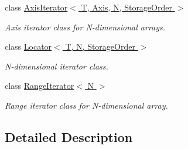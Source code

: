 \begin{DoxyCompactItemize}
class \hyperlink{class_d_o_1_1_axis_iterator}{Axis\-Iterator$<$ T, Axis, N, Storage\-Order $>$}
\begin{DoxyCompactList}\small\item\em Axis iterator class for N-\/dimensional arrays. \end{DoxyCompactList}\item 
class \hyperlink{class_d_o_1_1_locator}{Locator$<$ T, N, Storage\-Order $>$}
\begin{DoxyCompactList}\small\item\em N-\/dimensional iterator class. \end{DoxyCompactList}\item 
class \hyperlink{class_d_o_1_1_range_iterator}{Range\-Iterator$<$ N $>$}
\begin{DoxyCompactList}\small\item\em Range iterator class for N-\/dimensional array. \end{DoxyCompactList}\end{DoxyCompactItemize}


\subsection{Detailed Description}
